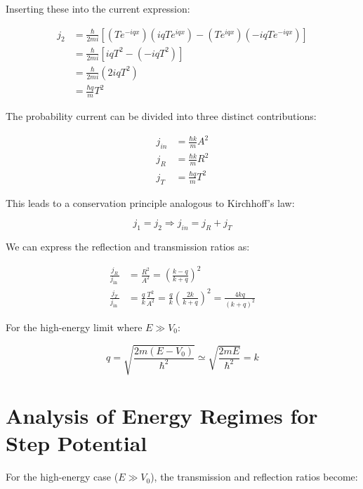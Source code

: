 Inserting these into the current expression:

\begin{align}
j_{2} & =\frac{\hbar}{2 m i}\left[\left(T e^{-i q x}\right)\left(i q T e^{i q x}\right)-\left(T e^{i q x}\right)\left(-i q T e^{-i q x}\right)\right] \\
& =\frac{\hbar}{2 m i}\left[i q T^{2}-\left(-i q T^{2}\right)\right]  \\
& =\frac{\hbar}{2 m i}\left(2 i q T^{2}\right) \\
& =\frac{\hbar q}{m} T^{2}
\end{align}

The probability current can be divided into three distinct contributions:

\begin{align}
j_{i n} & =\frac{\hbar k}{m} A^{2} \\
j_{R} & =\frac{\hbar k}{m} R^{2}  \\
j_{T} & =\frac{\hbar q}{m} T^{2}
\end{align}

This leads to a conservation principle analogous to Kirchhoff's law:

\begin{equation}
j_{1}=j_{2} \Longrightarrow j_{i n}=j_{R}+j_{T}
\end{equation}

We can express the reflection and transmission ratios as:

\begin{align}
\frac{j_{R}}{j_{\text {in }}} & =\frac{R^{2}}{A^{2}}=\left(\frac{k-q}{k+q}\right)^{2} \\
\frac{j_{T}}{j_{\text {in }}} & =\frac{q}{k} \frac{T^{2}}{A^{2}}=\frac{q}{k}\left(\frac{2 k}{k+q}\right)^{2}=\frac{4 k q}{(k+q)^{2}}
\end{align}

For the high-energy limit where $E \gg V_{0}$:

\begin{equation}
q=\sqrt{\frac{2 m\left(E-V_{0}\right)}{\hbar^{2}}} \simeq \sqrt{\frac{2 m E}{\hbar^{2}}}=k
\end{equation}


\section{Analysis of Energy Regimes for Step Potential}

For the high-energy case ($E \gg V_{0}$), the transmission and reflection ratios become:

